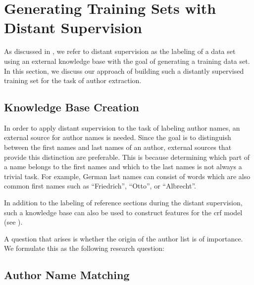 \section{Generating Training Sets with Distant Supervision}\label{sec:ae-distant-supervision}

As discussed in , we refer to distant supervision as the labeling of a data set using an external knowledge base with the goal of generating a training data set.
In this section, we discuss our approach of building such a distantly supervised training set for the task of author extraction.

\subsection{Knowledge Base Creation}\label{subsec:ae-knowledge-base-creation}

In order to apply distant supervision to the task of labeling author names, an external source for author names is needed.
Since the goal is to distinguish between the first names and last names of an author, external sources that provide this distinction are preferable.
This is because determining which part of a name belongs to the first names and which to the last names is not always a trivial task.
For example, German last names can consist of words which are also common first names such as ``Friedrich'', ``Otto'', or ``Albrecht''.

In addition to the labeling of reference sections during the distant supervision, such a knowledge base can also be used to construct features for the \gls{crf} model (see ).

\bigskip

A question that arises is whether the origin of the author list is of importance.
We formulate this as the following research question:
\newcommand\researchquestionone{}
\researchquestionone%

\subsection{Author Name Matching}\label{subsec:ae-author-name-matching}

